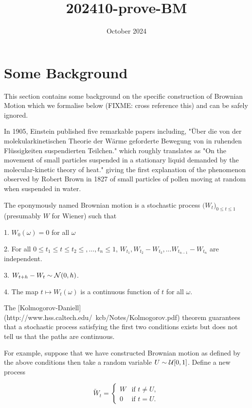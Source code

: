 \documentclass{article}
\begin{document}
\newtheorem{theorem}{Theorem}
\newtheorem{definition}{Definition}



\title{202410-prove-BM}
\date{October 2024}



\maketitle

\section{Some Background}

This section contains some background on the specific construction of
Brownian Motion which we formalise below (FIXME: cross reference this)
and can be safely ignored.

In 1905, Einstein published five remarkable papers including, "Über
die von der molekularkinetischen Theorie der Wärme geforderte Bewegung
von in ruhenden Flüssigkeiten suspendierten Teilchen." which roughly
translates as "On the movement of small particles suspended in a
stationary liquid demanded by the molecular-kinetic theory of heat."
giving the first explanation of the phenomenon observed by Robert
Brown in 1827 of small particles of pollen moving at random when
suspended in water.

The eponymously named Brownian motion is a stochastic process
$\big(W_t\big)_{0 \le t \le 1}$ (presumably $W$ for Wiener) such that

1. $W_0(\omega) = 0$ for all $\omega$

2. For all $0 \le t_1 \le t \le t_2 \le, \ldots, t_n \le 1$, $W_{t_1}, W_{t_2} - W_{t_3}, \ldots W_{t_{n-1}} - W_{t_n}$ are independent.

3. $W_{t+h} - W_t \sim {\cal{N}}(0,h)$.

4. The map $t \mapsto W_t(\omega)$ is a continuous function of $t$ for
all $\omega$.

The
[Kolmogorov-Daniell](http://www.hss.caltech.edu/~kcb/Notes/Kolmogorov.pdf)
theorem guarantees that a stochastic process satisfying the first two
conditions exists but does not tell us that the paths are
continuous.

For example, suppose that we have constructed Brownian motion as
defined by the above conditions then take a random variable $U \sim {\cal{U}}[0,1]$. Define a new process

$$
\tilde{W}_t =
  \begin{cases}
    W & \text{if } t \neq U, \\
    0 & \text{if } t = U.
  \end{cases}
$$
\end{document}
